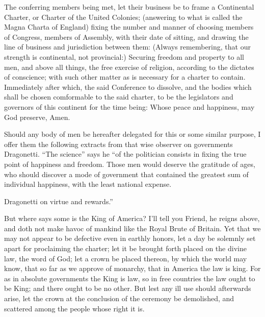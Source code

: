 \documentclass[12pt,oneside]{memoir}
\begin{document}
The conferring members being met, let their business be to frame a
Continental Charter, or Charter of the United Colonies; (answering
to what is called the Magna Charta of England) fixing the number and
manner of choosing members of Congress, members of Assembly, with
their date of sitting, and drawing the line of business and 
jurisdiction between them: (Always remembering, that our strength is
continental, not provincial:) Securing freedom and property to all
men, and above all things, the free exercise of religion, according
to the dictates of conscience; with such other matter as is
necessary for a charter to contain. Immediately after which, the
said Conference to dissolve, and the bodies which shall be chosen
comformable to the said charter, to be the legislators and governors
of this continent for the time being: Whose peace and happiness, may
God preserve, Amen.

Should any body of men be hereafter delegated for this or some
similar purpose, I offer them the following extracts from that wise
observer on governments Dragonetti. ``The science'' says he ``of the
politician consists in fixing the true point of happiness and
freedom. Those men would deserve the gratitude of ages, who should
discover a mode of government that contained the greatest sum of
individual happiness, with the least national expense.

Dragonetti on virtue and rewards.''

But where says some is the King of America? I'll tell you Friend, he
reigns above, and doth not make havoc of mankind like the Royal
Brute of Britain. Yet that we may not appear to be defective even in
earthly honors, let a day be solemnly set apart for proclaiming the
charter; let it be brought forth placed on the divine law, the word
of God; let a crown be placed thereon, by which the world may know,
that so far as we approve of monarchy, that in America the law is
king. For as in absolute governments the King is law, so in free
countries the law ought to be King; and there ought to be no other.
But lest any ill use should afterwards arise, let the crown at the
conclusion of the ceremony be demolished, and scattered among the
people whose right it is.
\end{document}
